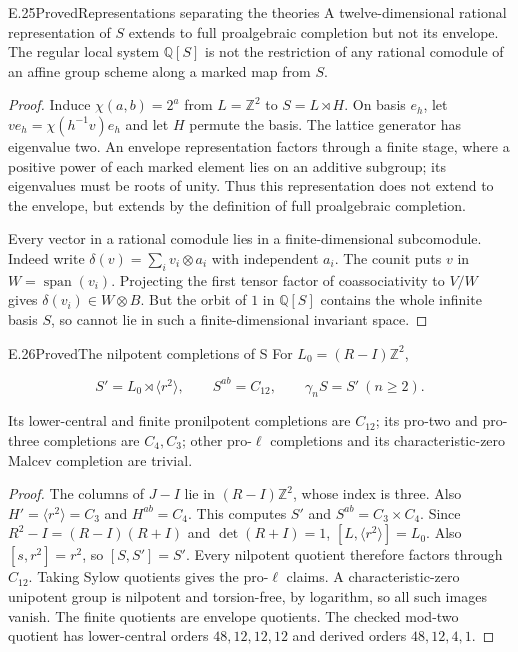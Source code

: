 \begin{statement}{E.25}{Proved}{Representations separating the theories}
A twelve-dimensional rational representation of $S$
extends to full proalgebraic completion but not its
envelope. The regular local system $\mathbb Q[S]$
is not the restriction of any rational comodule of
an affine group scheme along a marked map from $S$.
\end{statement}
\begin{proof}
Induce $\chi(a,b)=2^a$ from $L=\mathbb Z^2$ to $S=L\rtimes H$.
On basis $e_h$, let $v e_h=\chi(h^{-1}v)e_h$ and let
$H$ permute the basis. The lattice generator has
eigenvalue two. An envelope representation factors
through a finite stage, where a positive power of
each marked element lies on an additive subgroup;
its eigenvalues must be roots of unity.
Thus this representation does not extend to the envelope,
but extends by the definition of full proalgebraic completion.

Every vector in a rational comodule lies in a finite-dimensional
subcomodule. Indeed write
$\delta(v)=\sum_i v_i\otimes a_i$ with independent $a_i$.
The counit puts $v$ in $W=\operatorname{span}(v_i)$.
Projecting the first tensor factor of coassociativity
to $V/W$ gives $\delta(v_i)\in W\otimes B$.
But the orbit of $1$ in $\mathbb Q[S]$ contains the
whole infinite basis $S$, so cannot lie in such a
finite-dimensional invariant space.
\end{proof}

\begin{statement}{E.26}{Proved}{The nilpotent completions of S}
For $L_0=(R-I)\mathbb Z^2$,

$$
S'=L_0\rtimes\langle r^2\rangle,\qquad
 S^{ab}=C_{12},\qquad \gamma_nS=S'\ (n\ge2).
$$

Its lower-central and finite pronilpotent completions
are $C_{12}$; its pro-two and pro-three completions
are $C_4,C_3$; other pro-$\ell$ completions and its
characteristic-zero Malcev completion are trivial.
\end{statement}
\begin{proof}
The columns of $J-I$ lie in $(R-I)\mathbb Z^2$,
whose index is three.
Also $H'=\langle r^2\rangle=C_3$ and $H^{ab}=C_4$.
This computes $S'$ and $S^{ab}=C_3\times C_4$.
Since $R^2-I=(R-I)(R+I)$ and $\det(R+I)=1$,
$[L,\langle r^2\rangle]=L_0$.
Also $[s,r^2]=r^2$, so $[S,S']=S'$.
Every nilpotent quotient therefore factors through
$C_{12}$. Taking Sylow quotients gives the pro-$\ell$
claims. A characteristic-zero unipotent group is nilpotent
and torsion-free, by logarithm, so all such images vanish.
The finite quotients are envelope quotients.
The checked mod-two quotient has lower-central orders
$48,12,12,12$ and derived orders $48,12,4,1$.
\end{proof}

